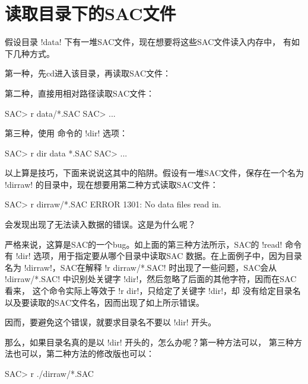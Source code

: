 \section{读取目录下的SAC文件}
\label{sec:read-dir}
假设目录 !data! 下有一堆SAC文件，现在想要将这些SAC文件读入内存中，
有如下几种方式。

第一种，先cd进入该目录，再读取SAC文件：

第二种，直接用相对路径读取SAC文件：
\begin{SACCode}
SAC> r data/*.SAC
SAC> ...
\end{SACCode}

第三种，使用 命令的 !dir! 选项：
\begin{SACCode}
SAC> r dir data *.SAC
SAC> ...
\end{SACCode}

以上算是技巧，下面来说说这其中的陷阱。假设有一堆SAC文件，保存在一个名为
!dirraw! 的目录中，现在想要用第二种方式读取SAC文件：
\begin{SACCode}
SAC> r dirraw/*.SAC
 ERROR 1301: No data files read in.
\end{SACCode}
会发现出现了无法读入数据的错误。这是为什么呢？

严格来说，这算是SAC的一个bug。如上面的第三种方法所示，SAC的
!read! 命令有 !dir! 选项，用于指定要从哪个目录中读取SAC
数据。在上面例子中，因为目录名为 !dirraw!，SAC在解释
!r dirraw/*.SAC! 时出现了一些问题，SAC会从 !dirraw/*.SAC!
中识别处关键字 !dir!，然后忽略了后面的其他字符，因而在SAC看来，
这个命令实际上等效于 !r dir!，只给定了关键字 !dir!，却
没有给定目录名以及要读取的SAC文件名，因而出现了如上所示错误。

因而，要避免这个错误，就要求目录名不要以 !dir! 开头。

那么，如果目录名真的是以 !dir! 开头的，怎么办呢？第一种方法可以，
第三种方法也可以，第二种方法的修改版也可以：
\begin{SACCode}
SAC> r ./dirraw/*.SAC
\end{SACCode}
